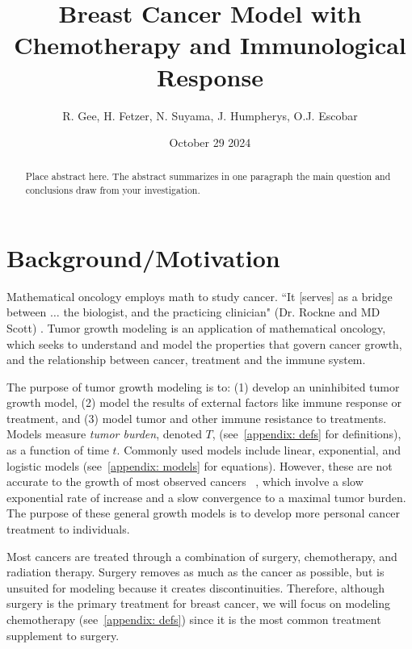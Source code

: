 \documentclass[11pt]{amsart}
\title{Breast Cancer Model with Chemotherapy and Immunological Response}
\author{R. Gee, H. Fetzer, N. Suyama, J. Humpherys, O.J. Escobar}
\date{October 29 2024} %
\begin{document}
\maketitle %

\begin{abstract}
Place abstract here. The abstract summarizes in one paragraph the main question and conclusions draw from your investigation.
\end{abstract}

\section{Background/Motivation}

Mathematical oncology employs math to study cancer.
``It [serves] as a bridge between $\ldots$ the biologist, and the practicing clinician" (Dr. Rockne and MD Scott) \cite{IntroMathOnc}.
Tumor growth modeling is an application of mathematical oncology, which seeks to understand and model the properties that govern cancer growth, and the relationship between cancer, treatment and the immune system.

The purpose of tumor growth modeling is to: (1) develop an uninhibited tumor growth model, (2) model the results of external factors like immune response or treatment, and (3) model tumor and other immune resistance to treatments.
Models measure \textit{tumor burden}, denoted $T$, (see\ \ref{appendix: defs} for definitions), as a function of time $t$.
Commonly used models include linear, exponential, and logistic models (see\ \ref{appendix: models} for equations).
However, these are not accurate to the growth of most observed cancers \ \cite{Steb23}, which involve a slow exponential rate of increase and a slow convergence to a maximal tumor burden.
The purpose of these general growth models is to develop more personal cancer treatment to individuals.\ \cite{YinMoes}

Most cancers are treated through a combination of surgery, chemotherapy, and radiation therapy.
Surgery removes as much as the cancer as possible, but is unsuited for modeling because it creates discontinuities.
Therefore, although surgery is the primary treatment for breast cancer, we will focus on modeling chemotherapy (see\ \ref{appendix: defs}) since it is the most common treatment supplement to surgery.
\end{document}
